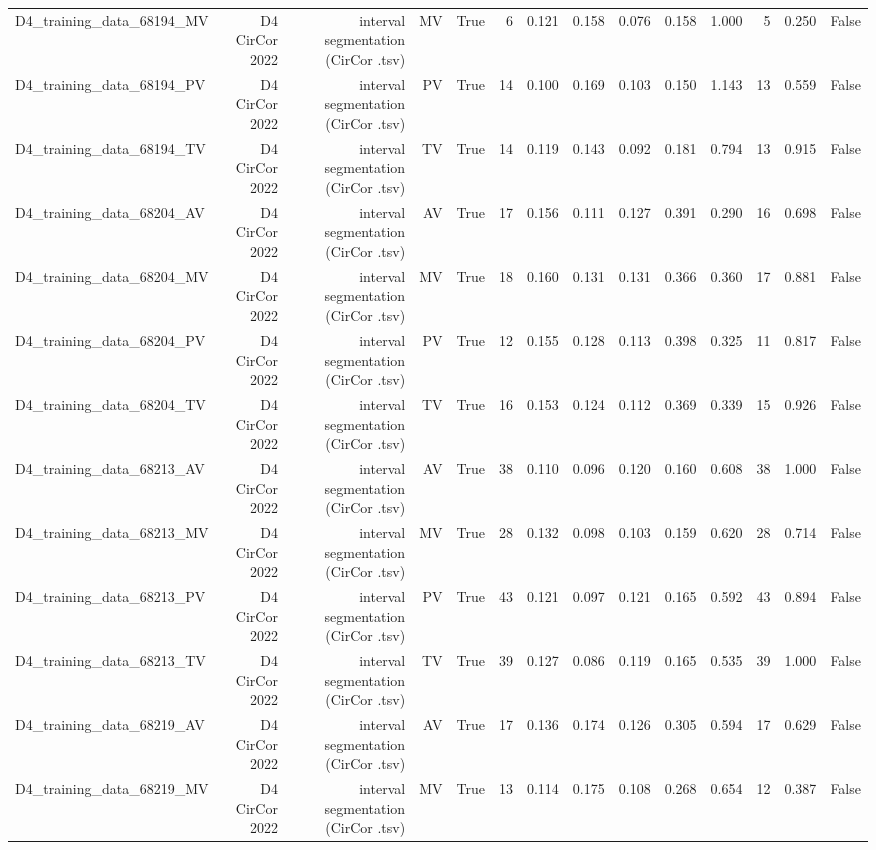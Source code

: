 \begin{table}[htbp]
\begin{tabular}{lrrrrrrrrrrrrr}
    D4\_training\_data\_68194\_MV & D4 CirCor 2022 & interval segmentation (CirCor .tsv) & MV & True & 6 & 0.121 & 0.158 & 0.076 & 0.158 & 1.000 & 5 & 0.250 & False \\
    D4\_training\_data\_68194\_PV & D4 CirCor 2022 & interval segmentation (CirCor .tsv) & PV & True & 14 & 0.100 & 0.169 & 0.103 & 0.150 & 1.143 & 13 & 0.559 & False \\
    D4\_training\_data\_68194\_TV & D4 CirCor 2022 & interval segmentation (CirCor .tsv) & TV & True & 14 & 0.119 & 0.143 & 0.092 & 0.181 & 0.794 & 13 & 0.915 & False \\
    D4\_training\_data\_68204\_AV & D4 CirCor 2022 & interval segmentation (CirCor .tsv) & AV & True & 17 & 0.156 & 0.111 & 0.127 & 0.391 & 0.290 & 16 & 0.698 & False \\
    D4\_training\_data\_68204\_MV & D4 CirCor 2022 & interval segmentation (CirCor .tsv) & MV & True & 18 & 0.160 & 0.131 & 0.131 & 0.366 & 0.360 & 17 & 0.881 & False \\
    D4\_training\_data\_68204\_PV & D4 CirCor 2022 & interval segmentation (CirCor .tsv) & PV & True & 12 & 0.155 & 0.128 & 0.113 & 0.398 & 0.325 & 11 & 0.817 & False \\
    D4\_training\_data\_68204\_TV & D4 CirCor 2022 & interval segmentation (CirCor .tsv) & TV & True & 16 & 0.153 & 0.124 & 0.112 & 0.369 & 0.339 & 15 & 0.926 & False \\
    D4\_training\_data\_68213\_AV & D4 CirCor 2022 & interval segmentation (CirCor .tsv) & AV & True & 38 & 0.110 & 0.096 & 0.120 & 0.160 & 0.608 & 38 & 1.000 & False \\
    D4\_training\_data\_68213\_MV & D4 CirCor 2022 & interval segmentation (CirCor .tsv) & MV & True & 28 & 0.132 & 0.098 & 0.103 & 0.159 & 0.620 & 28 & 0.714 & False \\
    D4\_training\_data\_68213\_PV & D4 CirCor 2022 & interval segmentation (CirCor .tsv) & PV & True & 43 & 0.121 & 0.097 & 0.121 & 0.165 & 0.592 & 43 & 0.894 & False \\
    D4\_training\_data\_68213\_TV & D4 CirCor 2022 & interval segmentation (CirCor .tsv) & TV & True & 39 & 0.127 & 0.086 & 0.119 & 0.165 & 0.535 & 39 & 1.000 & False \\
    D4\_training\_data\_68219\_AV & D4 CirCor 2022 & interval segmentation (CirCor .tsv) & AV & True & 17 & 0.136 & 0.174 & 0.126 & 0.305 & 0.594 & 17 & 0.629 & False \\
    D4\_training\_data\_68219\_MV & D4 CirCor 2022 & interval segmentation (CirCor .tsv) & MV & True & 13 & 0.114 & 0.175 & 0.108 & 0.268 & 0.654 & 12 & 0.387 & False \\

\end{tabular}
\end{table}
